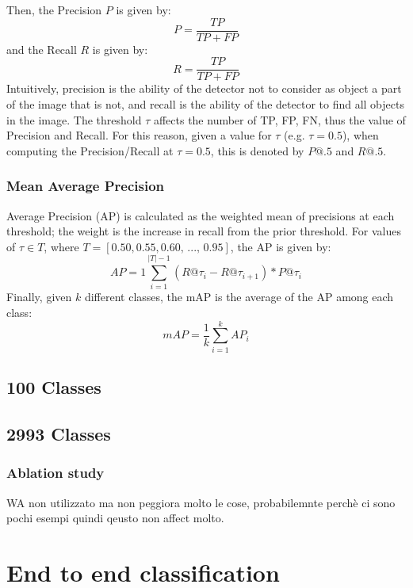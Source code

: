 Then, the Precision $P$ is given by:
\begin{equation} %
    P = \frac{TP}{TP + FP}
\end{equation}
and the Recall $R$ is given by:
\begin{equation} %
    R = \frac{TP}{TP + FP}
\end{equation}
Intuitively, precision is the ability of the detector not to consider as object a part of the image that is not, and recall is the ability of the detector to find all objects in the image.
The threshold $\tau$ affects the number of TP, FP, FN, thus the value of Precision and Recall. For this reason, given a value for $\tau$ (e.g. $\tau = 0.5$), when computing the Precision/Recall at $\tau = 0.5$, this is denoted by $P@.5$ and $R@.5$.

\subsubsection{Mean Average Precision}
Average Precision (AP) is calculated as the weighted mean of precisions at each threshold; the weight is the increase in recall from the prior threshold. For values of $\tau \in T$, where $T = [0.50, 0.55, 0.60,\, ..., \, 0.95 ]$, the AP is given by:
\begin{equation}
    AP = 1 \sum_{i=1}^{|T| - 1}(R@\tau_i - R@\tau_{i+1} ) * P@\tau_{i}
\end{equation}
Finally, given $k$ different classes, the mAP is the average of the AP among each class:
\begin{equation}
    mAP = \frac{1}{k} \sum_{i=1}^{k} AP_i
\end{equation}

\subsection{100 Classes}
\subsection{2993 Classes}
\subsubsection{Ablation study}
WA non utilizzato ma non peggiora molto le cose, probabilemnte perchè ci sono pochi esempi quindi qeusto non affect molto.


\section{End to end classification}
\label{sec:exp-end2end}
